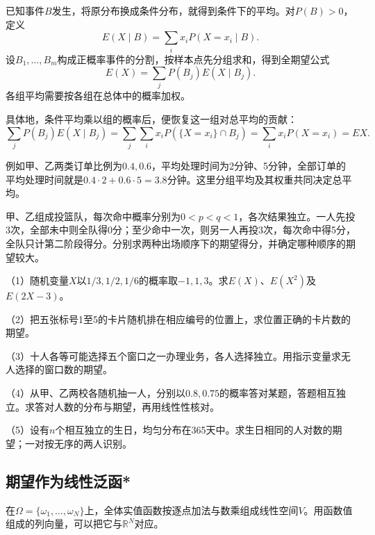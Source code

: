 已知事件\(B\)发生，将原分布换成条件分布，就得到条件下的平均。对\(P(B)>0\)，定义
\[
 E(X\mid B)=\sum_i x_iP(X=x_i\mid B).
\]
设\(B_1,\ldots,B_m\)构成正概率事件的分割，按样本点先分组求和，得到{\heiti 全期望公式}
\begin{equation}\label{eq:prob-total-expectation}
 E(X)=\sum_jP(B_j)E(X\mid B_j).
\end{equation}
各组平均需要按各组在总体中的概率加权。

具体地，条件平均乘以组的概率后，便恢复这一组对总平均的贡献：
\[
 \sum_jP(B_j)E(X\mid B_j)
 =\sum_j\sum_i x_iP(\{X=x_i\}\cap B_j)
 =\sum_i x_iP(X=x_i)=EX.
\]

例如甲、乙两类订单比例为\(0.4,0.6\)，平均处理时间为2分钟、5分钟，全部订单的平均处理时间就是\(0.4\cdot2+0.6\cdot5=3.8\)分钟。这里分组平均及其权重共同决定总平均。

\begin{example}[据2024年新课标II卷改编]
甲、乙组成投篮队，每次命中概率分别为\(0<p<q<1\)，各次结果独立。一人先投3次，全部未中则全队得0分；至少命中一次，则另一人再投3次，每次命中得5分，全队只计第二阶段得分。分别求两种出场顺序下的期望得分，并确定哪种顺序的期望较大。
\end{example}

\begin{exercise}
\mbox{}\par\nobreak

（1）随机变量\(X\)以\(1/3,1/2,1/6\)的概率取\(-1,1,3\)。求\(E(X)\)、\(E(X^2)\)及\(E(2X-3)\)。

（2）把五张标号1至5的卡片随机排在相应编号的位置上，求位置正确的卡片数的期望。

（3）十人各等可能选择五个窗口之一办理业务，各人选择独立。用指示变量求无人选择的窗口数的期望。

（4）从甲、乙两校各随机抽一人，分别以\(0.8,0.75\)的概率答对某题，答题相互独立。求答对人数的分布与期望，再用线性性核对。

（5）设有\(n\)个相互独立的生日，均匀分布在365天中。求生日相同的人对数的期望；一对按无序的两人识别。
\end{exercise}

\FloatBarrier
\newpage
\subsection{期望作为线性泛函*}

在\(\Omega=\{\omega_1,\ldots,\omega_N\}\)上，全体实值函数按逐点加法与数乘组成线性空间\(V\)。用函数值组成的列向量，可以把它与\(\mathbb R^N\)对应。

